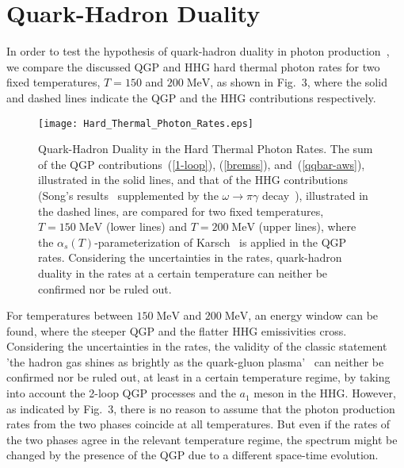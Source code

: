 \documentclass[12pt,twoside,fleqn]{article}
\newcommand{\figcaptionwidth}{15.cm}
\newcommand{\MeV}{\mbox{MeV}}
\begin{document}
\section{Quark-Hadron Duality}
\label{Quark-Hadron_Duality}
%
In order to test the hypothesis of quark-hadron duality in photon
production~\cite{RAPP_1999,GALLMEISTER_2000}, we compare the discussed QGP and
HHG hard thermal photon rates for two fixed temperatures, $T = 150$ and
$200\;\MeV$, as shown in Fig.~3, where the solid and dashed lines indicate the
QGP and the HHG contributions respectively.
\begin{figure}
  \texttt{[image: Hard\_Thermal\_Photon\_Rates.eps]}
  \parbox{\figcaptionwidth}{\caption[Quark-Hadron Duality in the Hard Thermal
    Photon Rates] {Quark-Hadron Duality in the Hard Thermal Photon Rates. The
      sum of the QGP contributions~(\ref{1-loop}), (\ref{bremss}),
      and~(\ref{qqbar-aws}), illustrated in the solid lines, and that of the HHG
      contributions (Song's results~\cite{SONG_1993,SONG_1998} supplemented by
      the $\omega \rightarrow \pi \gamma$ decay~\cite{KAPUSTA_1991}),
      illustrated in the dashed lines, are compared for two fixed temperatures,
      $T = 150\;\MeV$ (lower lines) and $T = 200\;\MeV$ (upper lines), where the
      $\alpha_s(T)$-parameterization of Karsch~\cite{KARSCH_1988} is applied in
      the QGP rates. Considering the uncertainties in the rates, quark-hadron
      duality in the rates at a certain temperature can neither be confirmed nor
      be ruled out.}}
\label{Fig_hard_thermal_photon_rates_duality}
\end{figure} 
%
For temperatures between $150\;\MeV$ and $200\;\MeV$, an energy window can be
found, where the steeper QGP and the flatter HHG emissivities cross. Considering
the uncertainties in the rates, the validity of the classic statement 'the
hadron gas shines as brightly as the quark-gluon plasma'~\cite{KAPUSTA_1991} can
neither be confirmed nor be ruled out, at least in a certain temperature regime,
by taking into account the 2-loop QGP processes and the $a_1$ meson in the HHG.
However, as indicated by Fig.~3, there is no reason to assume that the photon
production rates from the two phases coincide at all temperatures. But even if
the rates of the two phases agree in the relevant temperature regime, the
spectrum might be changed by the presence of the QGP due to a different
space-time evolution.
%
\end{document}
